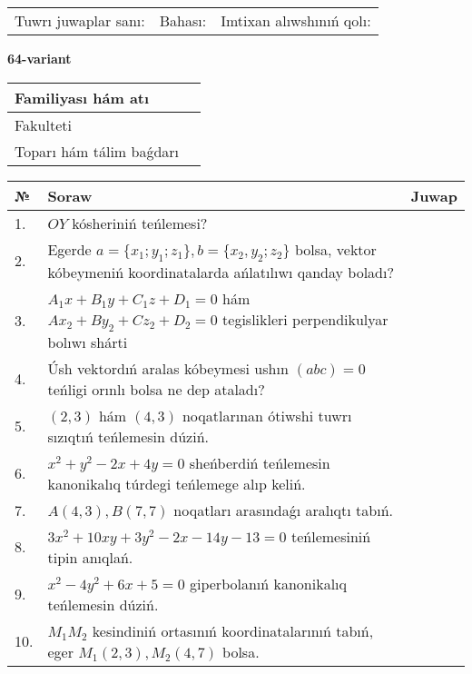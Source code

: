 \documentclass{article}
\begin{document}
\vspace{1cm}

\begin{tabular}{lll}
Tuwrı juwaplar sanı: \underline{\hspace{1.5cm}} & 
Bahası: \underline{\hspace{1.5cm}} & 
Imtixan alıwshınıń qolı: \underline{\hspace{2cm}} \\
\end{tabular}

\egroup

\newpage


\textbf{64-variant}\\

\bgroup
\def\arraystretch{1.6} %

\begin{tabular}{|m{5.7cm}|m{9.5cm}|}
\hline
Familiyası hám atı & \\
\hline
Fakulteti  & \\
\hline
Toparı hám tálim baǵdarı  & \\
\hline
\end{tabular}

\vspace{1cm}

\begin{tabular}{|m{0.7cm}|m{10cm}|m{4cm}|}
\hline
№ & Soraw & Juwap \\
\hline
1. & $OY$ kósheriniń teńlemesi? &  \\
\hline
2. & Egerde $a=\{ x_1; y_1; z_1\}, b=\{ x_2, y_2; z_2\}$ bolsa, vektor kóbeymeniń koordinatalarda ańlatılıwı qanday boladı? &  \\
\hline
3. & $A_1x+B_1y+C_1z+D_1=0$ hám $Ax_2+By_2+Cz_2+D_2=0$ tegislikleri perpendikulyar bolıwı shárti &  \\
\hline
4. & Úsh vektordıń aralas kóbeymesi ushın $(abc)=0$ teńligi orınlı bolsa ne dep ataladı? &  \\
\hline
5. & $(2, 3)$ hám $(4, 3)$ noqatlarınan ótiwshi tuwrı sızıqtıń teńlemesin dúziń. &  \\
\hline
6. & $x^{2}+y^{2}-2x+4y=0$ sheńberdiń teńlemesin kanonikalıq túrdegi teńlemege alıp keliń. &  \\
\hline
7. & $A(4, 3), B(7, 7)$ noqatları arasındaǵı aralıqtı tabıń. &  \\
\hline
8. & $3x^{2}+10xy+3y^{2}-2x-14y-13=0$ teńlemesiniń tipin anıqlań. &  \\
\hline
9. & $x^{2}-4y^{2}+6x+5=0$ giperbolanıń kanonikalıq teńlemesin dúziń. &  \\
\hline
10. & $M_{1}M_{2}$ kesindiniń ortasınıń koordinatalarınıń tabıń, eger $M_{1} (2, 3), M_{2} (4, 7)$ bolsa. &  \\
\hline
\end{tabular}
\end{document}
